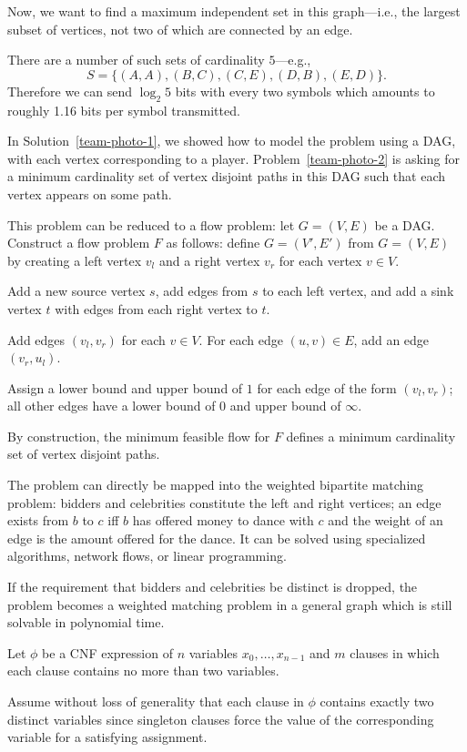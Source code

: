 Now, we want to find a maximum independent set in this graph---i.e.,
the largest subset of vertices, not two of which are connected by an edge.

There are a number of such sets of cardinality $5$---e.g.,  
\[
S = \{(A,A),(B,C),(C,E),(D,B),(E,D)\} .
\]
Therefore
we can send $\log_2 5$ bits with every two symbols which 
amounts to roughly 1.16 bits per symbol transmitted.

In Solution~\ref{team-photo-1}, we showed how to model the
problem using a DAG, with each vertex corresponding to a player.
Problem~\ref{team-photo-2} is asking for 
a minimum cardinality set of vertex disjoint paths in this DAG such
that each vertex appears on some path.

This problem can be reduced to a flow problem: let $G = (V,E)$ be a DAG.
Construct a flow problem $F$ as follows: define
$G = (V',E')$ from $G = (V,E)$ by creating
a left vertex $v_l$ and a right vertex $v_r$ for each vertex $v \in V$.

Add a new source vertex $s$, add edges from
$s$ to each left vertex, and add a sink vertex $t$ with edges from each right
vertex to $t$. 

Add edges $(v_l,v_r)$ for each $v\in V$.
For each edge $(u,v)\in E$, add an edge $(v_r, u_l)$.

Assign a lower bound and upper bound of $1$ for each edge of the form $(v_l, v_r)$;
all other edges have  a lower bound of $0$ and upper bound of $\infty$. 

By construction, the minimum feasible flow for $F$ defines
a minimum cardinality set of vertex disjoint paths.

The problem can directly be mapped into the weighted bipartite
matching problem: bidders and celebrities constitute the left and right
vertices; an edge exists from $b$ to $c$ iff $b$ has offered money to dance with
$c$ and the weight of an edge is the amount offered for the dance.
It can be solved using specialized algorithms, network flows, or linear programming.

If the requirement that bidders and celebrities be distinct is dropped, 
the problem becomes a weighted matching problem in a general graph which is still
solvable in polynomial time.


Let $\phi$ be a CNF expression of $n$ variables $x_0,\ldots,x_{n-1}$ and
$m$ clauses in which each clause contains no more than two variables.

Assume without loss of generality that each clause in $\phi$ contains
exactly two distinct variables since singleton clauses
force the value of the corresponding variable for a satisfying assignment.

